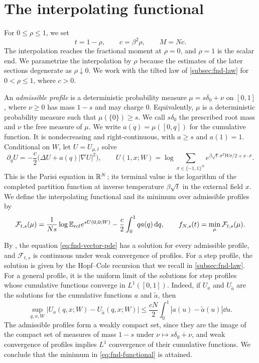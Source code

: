 \section{The interpolating functional}\label{sec:fnd-functional}

For $0\le\rho\le1$, we set
\[
 t=1-\rho,\qquad c=\beta^2\rho,\qquad M=Nc .
\]
The interpolation reaches the fractional moment at $\rho=0$, and
$\rho=1$ is the scalar end. We parametrize the interpolation by $\rho$
because the estimates of the later sections degenerate as
$\rho\downarrow0$. We work with the tilted law of \cref{subsec:fnd-law}
for $0<\rho\le1$,
where $c>0$.

An \emph{admissible profile} is a deterministic probability measure
$\mu=s\delta_0+\nu$ on $[0,1]$, where $\nu\ge0$ has mass $1-s$ and may
charge $0$. Equivalently, $\mu$ is a deterministic probability measure
such that $\mu(\{0\})\ge s$. We call $s\delta_0$ the prescribed root mass and
$\nu$ the free measure of $\mu$. We write $a(q)=\mu([0,q])$ for the
cumulative function. It is
nondecreasing and right-continuous, with $a\ge s$ and $a(1)=1$.
Conditional on $W$, let $U=U_{\mu,t}$ solve
\begin{equation}\label{eq:fnd-vector-pde}
 \partial_qU=-\frac c2\bigl(\Delta U+a(q)|\nabla U|^2\bigr),
 \qquad
 U(1,x;W)=\log\sum_{\sigma\in\{-1,1\}^N}
  e^{\beta\sqrt t\,\sigma^TW\sigma/2+x\cdot\sigma}.
\end{equation}
This is the Parisi equation in $\mathbb R^N$; its terminal value is the logarithm
of the completed partition function at inverse temperature $\beta\sqrt t$
in the external field $x$. We define the interpolating functional and its
minimum over admissible
profiles by
\begin{equation}\label{eq:fnd-functional}
 \mathcal F_{t,s}(\mu)
   =\frac1{Ns}\log\mathbb E_{\rm ref}e^{sU(0,0;W)}
       -\frac c2\int_0^1qa(q)\,\mathrm d q,
 \qquad f_{N,s}(t)=\min_{\mu}\mathcal F_{t,s}(\mu).
\end{equation}

By \cite[Section~2.6 and Proposition~2.3]{AL}, the equation
\eqref{eq:fnd-vector-pde} has a solution for every admissible profile,
and $\mathcal F_{t,s}$ is continuous under weak convergence of profiles.
For a step profile, the solution is given by the Hopf--Cole recursion that
we recall in
\cref{subsec:fnd-law}. For a general profile, it is the
uniform limit of the solutions for step profiles whose cumulative
functions converge in $L^1([0,1])$. Indeed, if $U_a$ and $U_{\tilde a}$
are the solutions for the cumulative functions $a$ and $\tilde a$, then
\cite[Section~2.6, (2.19)]{AL}
\[
 \sup_{q,x,W}\bigl|U_a(q,x;W)-U_{\tilde a}(q,x;W)\bigr|
 \le\frac{cN}2\int_0^1|a(u)-\tilde a(u)|\dd u .
\]
The admissible profiles form a weakly compact set, since they are the
image of the compact set of measures of mass $1-s$ under
$\nu\mapsto s\delta_0+\nu$, and weak convergence of profiles implies
$L^1$ convergence of their cumulative functions. We conclude that the
minimum in \eqref{eq:fnd-functional} is attained.

